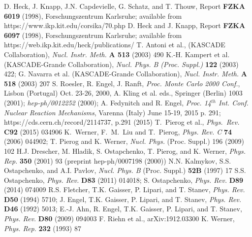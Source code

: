  D. Heck, J. Knapp, J.N. Capdevielle, G. Schatz, and
              T. Thouw, Report {\bf FZKA 6019} (1998), Forschungszentrum 
              Karls\-ruhe; available from\\
              https://www.ikp.kit.edu/corsika/70.php
 D. Heck and J. Knapp, Report {\bf FZKA 6097} (1998), 
              Forschungszentrum Karls\-ruhe; available from
              https://web.ikp.kit.edu/heck/publications/
 T. Antoni et al., (KASCADE Collaboration),
              {\it Nucl. Instr. Meth.} {\bf A 513} (2003) 490
 K.-H. Kampert et al. (KASCADE-Grande Collaboration), 
              {\it Nucl.  Phys. B (Proc. Suppl.)} {\bf 122} (2003) 422;
              G. Navarra et al. (KASCADE-Grande Collaboration),
              {\it Nucl. Instr. Meth.} {\bf A 518} (2003) 207
 S. Roesler, R. Engel, J. Ranft, {\it Proc. Monte Carlo
              2000 Conf.}, Lisbon (Portugal) Oct. 23-26, 2000,
              A. Kling et al. eds., Springer (Berlin) 1003 (2001);
              {\it hep-ph/0012252} (2000);
              A. Fedynitch and R. Engel, {\it Proc. 14$^{th}$  Int. Conf.
              Nuclear Reaction Mechanisms}, Varenna (Italy) June 15-19, 2015
              p. 291; https://cds.cern.ch/record/2114737, p.291 (2015)
 T.~Pierog et al., {\it Phys.\ Rev.} {\bf C92} (2015) 034906
 K.~Werner, F.~M.~Liu and T.~Pierog,
               {\it Phys. Rev. C} {\bf 74} (2006) 044902;
                T. Pierog and K. Werner, {\it Nucl. Phys.} (Proc. Suppl.) 
               196 (2009) 102
 H.J. Drescher, M. Hladik, S. Ostapchenko, T. Pierog, and
              K. Werner, {\it Phys. Rep.} {\bf 350} (2001) 93 
              (preprint hep-ph/0007198 (2000))
 N.N. Kalmykov, S.S. Ostapchenko, and A.I. Pavlov, {\it Nucl. 
              Phys. B} (Proc. Suppl.) {\bf 52B} (1997) 17
 S.S. Ostapchenko, {\it Phys. Rev.} {\bf D83} (2011) 014018;
              S. Ostapchenko, {\it Phys. Rev.} {\bf D89} (2014) 074009
R.S. Fletcher, T.K. Gaisser, P. Lipari, and T. Stanev,
              {\it Phys. Rev.} {\bf D50} (1994) 5710;
              J. Engel, T.K. Gaisser, P. Lipari, and T. Stanev,
              {\it Phys. Rev.} {\bf D46} (1992) 5013;
              E.-J. Ahn, R. Engel, T.K. Gaisser, P. Lipari, and T. Stanev, 
              {\it Phys. Rev.} {\bf D80} (2009) 094003
 F. Riehn et al., arXiv:1912.03300 
 K. Werner, {\it Phys. Rep.} {\bf 232} (1993) 87
